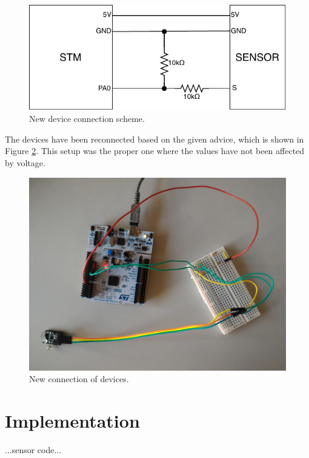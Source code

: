 \documentclass[11pt,a4paper]{article}
\begin{document}
\begin{figure}[H]
    \centering
    \includegraphics[scale=1.4]{img/new_con_scheme.pdf}
    \caption{New device connection scheme.}
    \label{fig:new_con_scheme}
\end{figure}

The devices have been reconnected based on the given advice, which is shown in Figure \ref{fig:new_dev_con}. This setup was the proper one where the values have not been affected by voltage.

\begin{figure}[H]
    \centering
    \includegraphics[scale=0.1]{img/setup2.jpg}
    \caption{New connection of devices.}
    \label{fig:new_dev_con}
\end{figure}

\newpage

\section{Implementation}

...sensor code\cite{SENSOR}...
\end{document}
